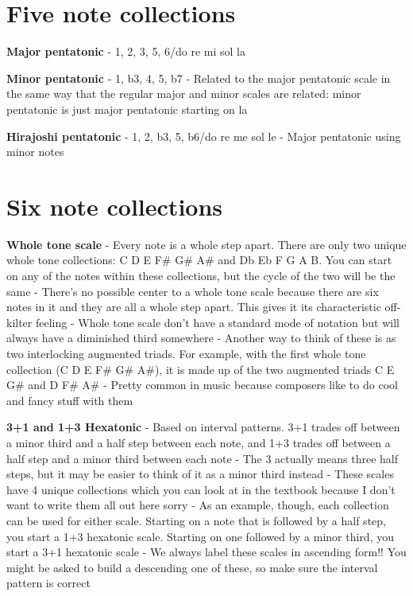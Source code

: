 \documentclass{book}
\begin{document}
\hypertarget{five-note-collections}{%
\section{Five note collections}\label{five-note-collections}}

\textbf{Major pentatonic} - 1, 2, 3, 5, 6/do re mi sol la

\textbf{Minor pentatonic} - 1, b3, 4, 5, b7 - Related to the major pentatonic
scale in the same way that the regular major and minor scales are related:
minor pentatonic is just major pentatonic starting on la

\textbf{Hirajoshi pentatonic} - 1, 2, b3, 5, b6/do re me sol le - Major
pentatonic using minor notes

\hypertarget{six-note-collections}{%
\section{Six note collections}\label{six-note-collections}}

\textbf{Whole tone scale} - Every note is a whole step apart. There are only
two unique whole tone collections: C D E F\# G\# A\# and Db Eb F G A B. You
can start on any of the notes within these collections, but the cycle of the
two will be the same - There's no possible center to a whole tone scale
because there are six notes in it and they are all a whole step apart. This
gives it its characteristic off-kilter feeling - Whole tone scale don't have a
standard mode of notation but will always have a diminished third somewhere -
Another way to think of these is as two interlocking augmented triads. For
example, with the first whole tone collection (C D E F\# G\# A\#), it is made
up of the two augmented triads C E G\# and D F\# A\# - Pretty common in music
because composers like to do cool and fancy stuff with them

\textbf{3+1 and 1+3 Hexatonic} - Based on interval patterns. 3+1 trades off
between a minor third and a half step between each note, and 1+3 trades off
between a half step and a minor third between each note - The 3 actually means
three half steps, but it may be easier to think of it as a minor third instead
- These scales have 4 unique collections which you can look at in the textbook
because I don't want to write them all out here sorry - As an example, though,
each collection can be used for either scale. Starting on a note that is
followed by a half step, you start a 1+3 hexatonic scale. Starting on one
followed by a minor third, you start a 3+1 hexatonic scale - We always label
these scales in ascending form!! You might be asked to build a descending one
of these, so make sure the interval pattern is correct
\end{document}

